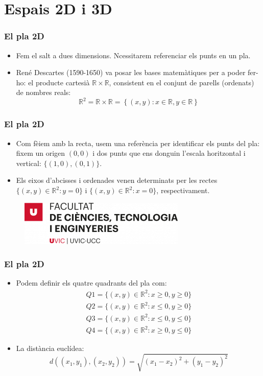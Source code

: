 \documentclass{beamer}
\begin{document}
\section{Espais 2D i 3D}
\begin{frame}
\frametitle{El pla 2D}
\begin{itemize}
\item Fem el salt a dues dimensions. Ncessitarem referenciar els punts en un pla.
\item René Descartes (1590-1650) va posar les bases matemàtiques per a poder fer-ho: el producte cartesià $\mathbb{R} \times \mathbb{R}$, consistent en el conjunt de parells (ordenats) de nombres reals:
\begin{equation}
  \mathbb{R}^2= \mathbb{R} \times \mathbb{R} = \left\{ (x,y): x \in \mathbb{R}, y \in \mathbb{R} \right\}
\end{equation}
\end{itemize}
\end{frame}
\begin{frame}
\frametitle{El pla 2D}
\begin{itemize}
\item Com fèiem amb la recta, usem una referència per identificar els punts del pla: fixem un origen $(0,0)$ i dos punts que ens donguin l'escala horitzontal i vertical: $\{(1,0),(0,1)\}$.
\item Els eixos d'abcisses i ordenades venen determinats per les rectes $\{(x,y)\in \mathbb{R}^2: y=0\}$ i $\{(x,y)\in \mathbb{R}^2: x=0\}$, respectivament.
\end{itemize}
\begin{figure}
\includegraphics[width=0.6\linewidth]{FCTE}
\end{figure}
\end{frame}
\begin{frame}
\frametitle{El pla 2D}
\begin{itemize}
  \item Podem definir els quatre quadrants del pla com:
\begin{eqnarray*}
  Q1 = \{(x,y) \in \mathbb{R}^2 : x \geq 0, y \geq 0 \} \\
  Q2 = \{(x,y) \in \mathbb{R}^2 : x \leq 0, y \geq 0 \} \\
  Q3 = \{(x,y) \in \mathbb{R}^2 : x \leq 0, y \leq 0 \} \\
  Q4 = \{(x,y) \in \mathbb{R}^2 : x \geq 0, y \leq 0 \}
\end{eqnarray*}
  \item La distància euclídea:
\begin{equation}
  d\left( (x_1,y_1),(x_2,y_2) \right) = \sqrt{(x_1-x_2)^2+(y_1-y_2)^2}
\end{equation}
\end{itemize}

\end{frame}
\end{document}
